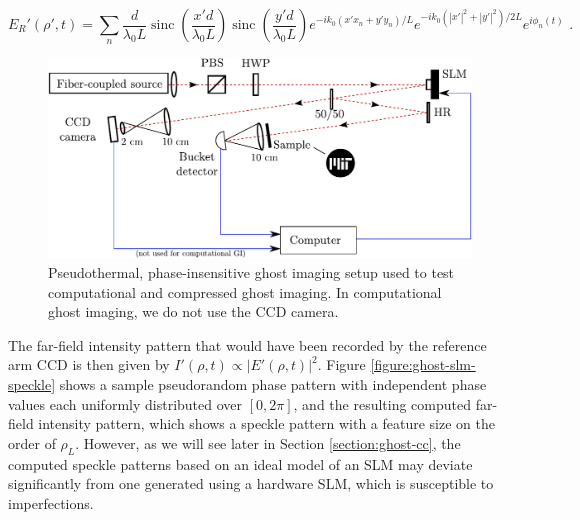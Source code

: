\begin{equation}
E_R'(\rho', t) = \sum_n \frac{d}{\lambda_0 L} \operatorname{sinc}\left(\frac{x'd}{\lambda_0 L}\right) \operatorname{sinc}\left(\frac{y'd}{\lambda_0 L}\right) e^{-i k_0(x'x_n + y'y_n)/L} e^{-ik_0(|x'|^2 + |y'|^2)/2L} e^{i\phi_n(t)}\,\,.
\label{equation:ghost-prop}
\end{equation}


\begin{figure}[t]
\begin{center}
\includegraphics[width=13cm]{figure-ghost-computational-setup.pdf}
\caption{Pseudothermal, phase-insensitive ghost imaging setup used to test computational and compressed ghost imaging. In computational ghost imaging, we do not use the CCD camera.}
\label{figure:ghost-computational-setup}
\end{center}
\end{figure}


The far-field intensity pattern that would have been recorded by the reference arm CCD is then given by $I'(\rho, t) \propto |E'(\rho, t)|^2$. Figure \ref{figure:ghost-slm-speckle} shows a sample pseudorandom phase pattern with independent phase values each uniformly distributed over $[0, 2\pi]$, and the resulting computed far-field intensity pattern, which shows a speckle pattern with a feature size on the order of $\rho_L$. However, as we will see later in Section \ref{section:ghost-cc}, the computed speckle patterns based on an ideal model of an SLM may deviate significantly from one generated using a hardware SLM, which is susceptible to imperfections.

